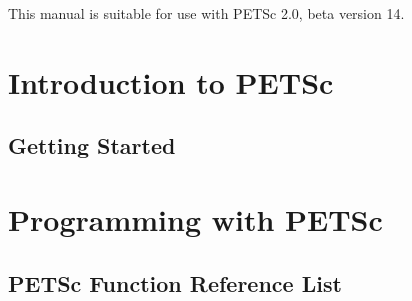 

\vspace{.4in}



\vspace{.4in}
          
\medskip \medskip 
This manual is suitable for use with PETSc 2.0, beta version 14.\\

\setcounter{page}{3}
\tableofcontents
\clearpage
{}


\part{Introduction to PETSc}
\label{part:intro}
\chapter{Getting Started}


\part{Programming with PETSc}
\label{part:usage}




\appendix

\chapter{PETSc Function Reference List}



\vfill
\eject









